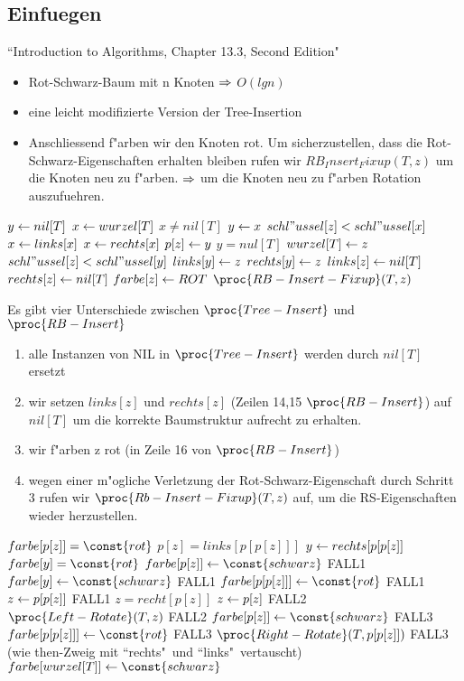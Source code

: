 \documentclass[a4paper,twoside,DIV15,BCOR12mm]{scrbook}
\begin{document}
\subsection{Einfuegen}
``Introduction to Algorithms, Chapter 13.3, Second Edition"
\begin{itemize}
\item Rot-Schwarz-Baum mit n Knoten $\Rightarrow$ $O(lg n)$ 
\item eine leicht modifizierte Version der Tree-Insertion
\item Anschliessend f"arben wir den Knoten rot. Um sicherzustellen, dass die Rot-Schwarz-Eigenschaften erhalten bleiben rufen wir $RB_Insert_Fixup(T,z)$ um die Knoten neu zu f"arben. $\Rightarrow$ um die Knoten neu zu f"arben Rotation auszufuehren.
\end{itemize}
\begin{codebox}
\li $y \leftarrow nil[T]$
\li $x \leftarrow wurzel[T]$
\li \While $x \ne nil[T]$
\li 	\Do $y \leftarrow x$
\li 		\If $schl"ussel[z] < schl"ussel[x]$
\li 			\Then $x \leftarrow links[x]$
\li 			\Else $x \leftarrow rechts[x]$
				\End
			\End
		\End
	\End
\li $p[z] \leftarrow y$
\li \If $y = nul[T]$
\li 	\Then $wurzel[T] \leftarrow z$
\li 	\ElseIf $schl"ussel[z] < schl"ussel[y]$
\li 		\Then $links[y] \leftarrow z$
\li 		\Else $rechts[y] \leftarrow z$
			\End
		\End
	\End
\li $links[z] \leftarrow nil[T]$
\li $rechts[z] \leftarrow nil[T]$
\li $farbe[z] \leftarrow ROT$
\li $\proc{RB-Insert-Fixup}(T,z)$
\end{codebox}
Es gibt vier Unterschiede zwischen $\proc{Tree-Insert}$ und $\proc{RB-Insert}$
\begin{enumerate}
\item alle Instanzen von NIL in $\proc{Tree-Insert}$ werden durch $nil[T]$ ersetzt
\item wir setzen $links[z]$ und $rechts[z]$ (Zeilen 14,15 $\proc{RB-Insert}$) auf $nil[T]$ um die korrekte Baumstruktur aufrecht zu erhalten.
\item wir f"arben z rot (in Zeile 16 von $\proc{RB-Insert}$) 
\item wegen einer m"ogliche Verletzung der Rot-Schwarz-Eigenschaft durch Schritt 3 rufen wir $\proc{Rb-Insert-Fixup}(T,z)$ auf, um die RS-Eigenschaften wieder herzustellen.
\end{enumerate}
\begin{codebox}
\li \While $farbe[p[z]] = \const{rot}$
\li 	\Do \If $p[z]=links[p[p[z]]]$
\li 		\Then $y \leftarrow rechts[p[p[z]]$
\li 			\If $farbe[y] = \const{rot}$
\li 				\Then $farbe[p[z]] \la \const{schwarz}$ \RComment FALL1
\li 				$farbe[y] \la \const{schwarz}$ \RComment FALL1
\li 				$farbe[p[p[z]]] \la \const{rot}$ \RComment FALL1
\li 				$z \leftarrow p[p[z]]$ \RComment FALL1
\li 			\ElseIf $z = recht[p[z]]$
\li 				\Then $z \leftarrow p[z]$ \RComment FALL2
\li 					$\proc{Left-Rotate}(T,z)$ \RComment FALL2
						\End
\li 				$farbe[p[z]] \la \const{schwarz}$ \RComment FALL3
\li 				$farbe[p[p[z]]]\la \const{rot}$ \RComment FALL3
\li 				$\proc{Right-Rotate}(T,p[p[z]])$ \RComment FALL3
					\End
				\End
			\End
\li \Else (wie then-Zweig mit ``rechts"\  und ``links"\ vertauscht)
		\End
	\End
\li $farbe[wurzel[T]]\la \const{schwarz}$
\end{codebox}
\end{document}
